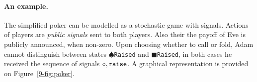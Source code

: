\paragraph{An example.}
The simplified poker can be 
modelled as a stochastic game with signals.
Actions of players are \emph{public signals}
sent to both players.
Also their the payoff of Eve is publicly announced,
when non-zero. 
Upon choosing whether to call or fold,
Adam cannot distinguish between states
$\spadesuit${\tt Raised} and $\blacksquare${\tt Raised},
in both cases he received the sequence of signals $\circ,{\tt raise}$.
A graphical representation is provided on
Figure~\ref{9-fig:poker}.

\newcommand{\pay}{ {\tt pay}}


